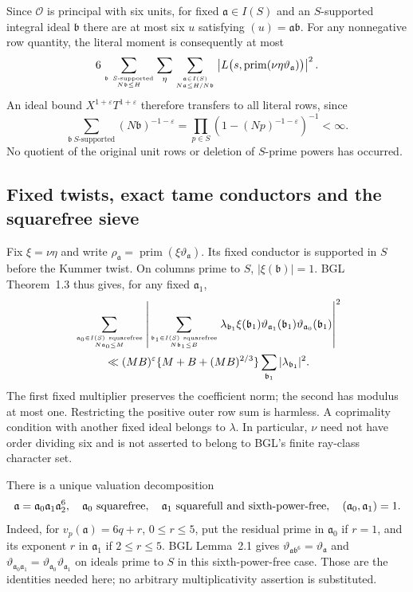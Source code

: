 Since $\mathcal O$ is principal with six units, for fixed
$\mathfrak a\in I(S)$ and an $S$-supported integral ideal
$\mathfrak b$ there are at most six $u$ satisfying
$(u)=\mathfrak a\mathfrak b$. For any nonnegative row quantity, the
literal moment is consequently at most
\begin{equation}\label{mm:literal-sum}
 6\sum_{\mathfrak b\ S\text{-supported}\atop N\mathfrak b\le H}
   \sum_{\eta}\sum_{\mathfrak a\in I(S)\atop N\mathfrak a\le H/N\mathfrak b}
 \left|L\bigl(s,\operatorname{prim}(\nu\eta
                       \vartheta_{\mathfrak a})\bigr)\right|^2.
\end{equation}
An ideal bound $X^{1+\varepsilon}T^{1+\varepsilon}$ therefore transfers
to all literal rows, since
\[
 \sum_{\mathfrak b\ S\text{-supported}}(N\mathfrak b)^{-1-\varepsilon}
 =\prod_{p\in S}(1-(Np)^{-1-\varepsilon})^{-1}<\infty.
\]
No quotient of the original unit rows or deletion of $S$-prime powers
has occurred.

\subsection{Fixed twists, exact tame conductors and the squarefree sieve}
Fix $\xi=\nu\eta$ and write
$\rho_{\mathfrak a}=\operatorname{prim}
(\xi\vartheta_{\mathfrak a})$. Its fixed conductor is supported in
$S$ before the Kummer twist. On columns prime to $S$, $|\xi(\mathfrak b)|=1$.
BGL Theorem~1.3 thus gives, for any fixed $\mathfrak a_1$,
\begin{align}\label{mm:ls}
 &\sum_{\mathfrak a_0\in I(S)\ \mathrm{squarefree}\atop N\mathfrak a_0\le M}
 \left|\sum_{\mathfrak b_1\in I(S)\ \mathrm{squarefree}\atop N\mathfrak b_1\le B}
 \lambda_{\mathfrak b_1}\xi(\mathfrak b_1)
 \vartheta_{\mathfrak a_1}(\mathfrak b_1)
 \vartheta_{\mathfrak a_0}(\mathfrak b_1)\right|^2\notag\\
 &\hspace{1cm}\ll (MB)^\varepsilon
 \{M+B+(MB)^{2/3}\}\sum_{\mathfrak b_1}|\lambda_{\mathfrak b_1}|^2.
\end{align}
The first fixed multiplier preserves the coefficient norm; the second
has modulus at most one. Restricting the positive outer row sum is
harmless. A coprimality condition with another fixed ideal belongs to
$\lambda$. In particular, $\nu$ need not have order dividing six and
is not asserted to belong to BGL's finite ray-class character set.

There is a unique valuation decomposition
\[
 \mathfrak a=\mathfrak a_0\mathfrak a_1\mathfrak a_2^6,
 \quad \mathfrak a_0\ \hbox{squarefree},\quad
 \mathfrak a_1\ \hbox{squarefull and sixth-power-free},\quad
 (\mathfrak a_0,\mathfrak a_1)=1.
\]
Indeed, for $v_p(\mathfrak a)=6q+r$, $0\le r\le5$, put the residual
prime in $\mathfrak a_0$ if $r=1$, and its exponent $r$ in
$\mathfrak a_1$ if $2\le r\le5$. BGL Lemma~2.1 gives
$\vartheta_{\mathfrak a\mathfrak b^6}=\vartheta_{\mathfrak a}$ and
$\vartheta_{\mathfrak a_0\mathfrak a_1}
=\vartheta_{\mathfrak a_0}\vartheta_{\mathfrak a_1}$ on ideals
prime to $S$ in this sixth-power-free case. Those are the identities
needed here; no arbitrary multiplicativity assertion is substituted.

